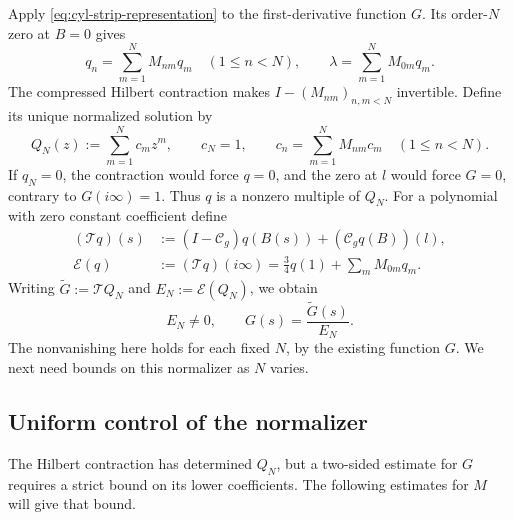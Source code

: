 Apply \eqref{eq:cyl-strip-representation} to the first-derivative
function \(G\).  Its order-\(N\) zero at \(B=0\) gives
\[
 q_n=\sum_{m=1}^N M_{nm}q_m\quad(1\le n<N),
 \qquad
 \lambda=\sum_{m=1}^N M_{0m}q_m.
\]
The compressed Hilbert contraction makes \(I-(M_{nm})_{n,m<N}\)
invertible.  Define its unique normalized solution by
\[
 Q_N(z):=\sum_{m=1}^N c_mz^m,\qquad
 c_N=1,\qquad c_n=\sum_{m=1}^N M_{nm}c_m\quad(1\le n<N).
\]
If \(q_N=0\), the contraction would force \(q=0\), and the zero at
\(l\) would force \(G=0\), contrary to \(G(i\infty)=1\).  Thus \(q\)
is a nonzero multiple of \(Q_N\).  For a polynomial with zero
constant coefficient define
\[
\begin{aligned}
 (\mathcal Tq)(s)&:=(I-\mathcal C_g)q(B(s))
                      +(\mathcal C_g q(B))(l),\\
 \mathcal E(q)&:=(\mathcal Tq)(i\infty)
       =\frac34q(1)+\sum_mM_{0m}q_m.
\end{aligned}
\]
Writing \(\widetilde G:=\mathcal TQ_N\) and
\(E_N:=\mathcal E(Q_N)\), we obtain
\begin{equation}\label{eq:cyl-normalized-G}
 E_N\ne0,\qquad G(s)=\frac{\widetilde G(s)}{E_N}.
\end{equation}
The nonvanishing here holds for each fixed \(N\), by the existing
function \(G\).  We next need bounds on this normalizer as \(N\)
varies.

\subsection{Uniform control of the normalizer}

The Hilbert contraction has determined \(Q_N\), but a two-sided
estimate for \(G\) requires a strict bound on its lower
coefficients.  The following estimates for \(M\) will give that bound.

